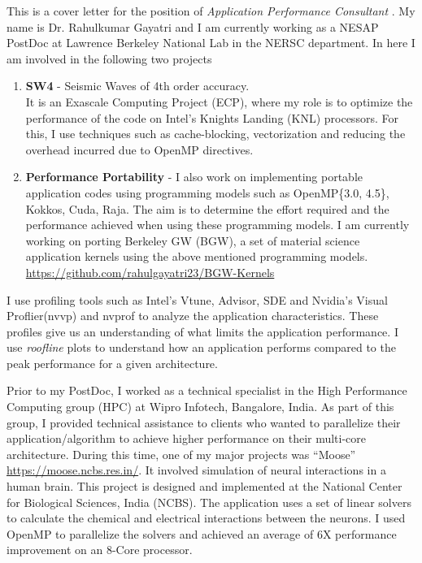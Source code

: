 \documentclass[10pt,stdletter,dateno]{newlfm}
\begin{document}
\begin{newlfm}
%
    This is a cover letter for the position of \textit{Application Performance Consultant }.
    My name is Dr. Rahulkumar Gayatri and I am currently working as a NESAP PostDoc at Lawrence Berkeley National Lab in the NERSC department.
    In here I am involved in the following two projects
\begin{enumerate}
    \item {\bf SW4} - Seismic Waves of 4th order accuracy. \\
        It is an Exascale Computing Project (ECP), where my role is to optimize the  performance of the code on Intel's Knights Landing (KNL) processors.
        For this, I use techniques such as cache-blocking, vectorization and reducing the overhead incurred due to OpenMP directives.
%
    \item {\bf Performance Portability} - I also work on implementing portable application codes using programming models such as OpenMP\{3.0, 4.5\}, Kokkos, Cuda, Raja.
        The aim is to determine the effort required and the performance achieved when using these programming models.
        I am currently working on porting Berkeley GW (BGW), a set of material science application kernels using the above mentioned programming models.
        \url{https://github.com/rahulgayatri23/BGW-Kernels}
\end{enumerate}
    I use profiling tools such as Intel's Vtune, Advisor, SDE and Nvidia's Visual Proflier(nvvp) and nvprof to analyze the application characteristics.
    These profiles give us an understanding of what limits the application performance.
    I use {\it roofline} plots to understand how an application performs compared to the peak performance for a given architecture.
%
    \par
    Prior to my PostDoc, I worked as a technical specialist in the High Performance Computing group (HPC) at Wipro Infotech, Bangalore, India.
    As part of this group, I provided technical assistance to clients who wanted to parallelize their application/algorithm to achieve higher performance on their multi-core architecture.
    During this time, one of my major projects was \enquote{Moose} \url{https://moose.ncbs.res.in/}.
    It involved simulation of neural interactions in a human brain.
    This project is designed and implemented at the National Center for Biological Sciences, India (NCBS).
    The application uses a set of linear solvers to calculate the chemical and electrical interactions between the neurons.
    I used OpenMP to parallelize the solvers and achieved an average of 6X performance improvement on an 8-Core processor.

\end{newlfm}
\end{document}

